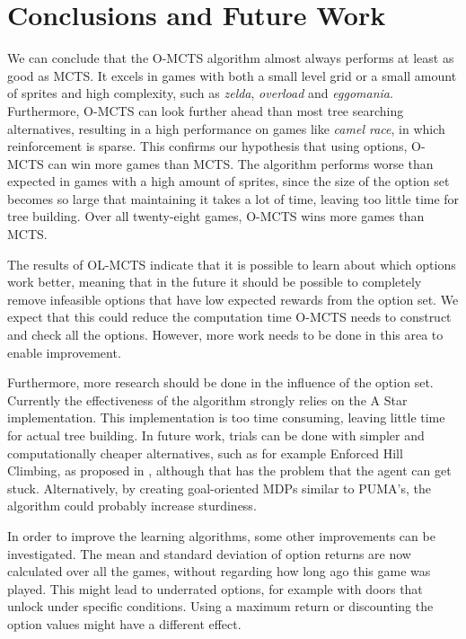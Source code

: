 \section{Conclusions and Future Work}
\label{sec:conclusion}
We can conclude that the O-MCTS algorithm almost always performs at least
as good as MCTS\@. It excels in games with both a small level grid or a small
amount of sprites and high complexity, such as \textit{zelda}, \textit{overload}
and \textit{eggomania}.  Furthermore, O-MCTS can look further ahead than most
tree searching alternatives, resulting in a high performance on games like
\textit{camel race}, in which reinforcement is sparse. This confirms our
hypothesis that using options, O-MCTS can win more games than MCTS\@. The
algorithm performs worse than expected in games with a high amount of sprites,
since the size of the option set becomes so large that maintaining it takes a
lot of time, leaving too little time for tree building. Over all twenty-eight
games, O-MCTS wins more games than MCTS\@.

The results of OL-MCTS indicate that it is possible to learn about which options
work better, meaning that in the future it should be possible to completely
remove infeasible options that have low expected rewards from the option set. We
expect that this could reduce the computation time O-MCTS needs to construct and
check all the options. However, more work needs to be done in this area to
enable improvement.

Furthermore, more research should be done in the influence of the option set.
Currently the effectiveness of the algorithm strongly relies on the A Star
implementation. This implementation is too time consuming, leaving
little time for actual tree building. In future work, trials can be done with
simpler and computationally cheaper alternatives, such as for example Enforced
Hill Climbing, as proposed in \cite{ross2014general}, although that has the
problem that the agent can get stuck. Alternatively, by creating goal-oriented
MDPs similar to PUMA's, the algorithm could probably increase sturdiness.

In order to improve the learning algorithms, some other improvements can be
investigated. 
The mean and standard deviation of option returns are now calculated over all
the games, without regarding how long ago this game was played. This might lead
to underrated options, for example with doors that unlock under specific
conditions.  Using a maximum return or discounting the option values might have
a different effect.

